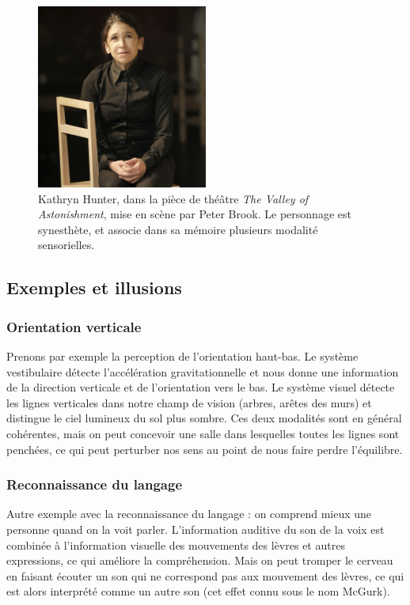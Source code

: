 \begin{figure}
\centering
\includegraphics[width=0.5\textwidth]{./files/Kathryn-Hunter_Peter-Brook_valley-of-astonishement.jpg}
\caption{Kathryn Hunter, dans la pièce de théâtre \emph{The Valley of Astonishment}, mise en scène par Peter Brook. Le personnage est synesthète, et associe dans sa mémoire plusieurs modalité sensorielles.}
\end{figure}

\subsection{Exemples et illusions}

\subsubsection{Orientation verticale}

Prenons par exemple la perception de l'orientation haut-bas. Le système vestibulaire détecte l'accélération gravitationnelle et nous donne une information de la direction verticale et de l'orientation vers le bas. Le système visuel détecte les lignes verticales dans notre champ de vision (arbres, arêtes des murs) et distingue le ciel lumineux du sol plus sombre. Ces deux modalités sont en général cohérentes, mais on peut concevoir une salle dans lesquelles toutes les lignes sont penchées, ce qui peut perturber nos sens au point de nous faire perdre l'équilibre.

\subsubsection{Reconnaissance du langage}

Autre exemple avec la reconnaissance du langage : on comprend mieux une personne quand on la voit parler. L'information auditive du son de la voix est combinée à l'information visuelle des mouvements des lèvres et autres expressions, ce qui améliore la compréhension. Mais on peut tromper le cerveau en faisant écouter un son qui ne correspond pas aux mouvement des lèvres, ce qui est alors interprété comme un autre son (cet effet connu sous le nom McGurk). 

